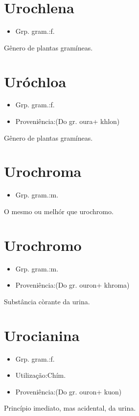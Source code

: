 \documentclass{article}
\begin{document}
\section{Urochlena}
\begin{itemize}
\item {Grp. gram.:f.}
\end{itemize}
Gênero de plantas gramíneas.
\section{Uróchloa}
\begin{itemize}
\item {Grp. gram.:f.}
\end{itemize}
\begin{itemize}
\item {Proveniência:(Do gr. \textunderscore oura\textunderscore  + \textunderscore khlon\textunderscore )}
\end{itemize}
Gênero de plantas gramíneas.
\section{Urochroma}
\begin{itemize}
\item {Grp. gram.:m.}
\end{itemize}
O mesmo ou melhór que \textunderscore urochromo\textunderscore .
\section{Urochromo}
\begin{itemize}
\item {Grp. gram.:m.}
\end{itemize}
\begin{itemize}
\item {Proveniência:(Do gr. \textunderscore ouron\textunderscore  + \textunderscore khroma\textunderscore )}
\end{itemize}
Substância còrante da urina.
\section{Urocianina}
\begin{itemize}
\item {Grp. gram.:f.}
\end{itemize}
\begin{itemize}
\item {Utilização:Chím.}
\end{itemize}
\begin{itemize}
\item {Proveniência:(Do gr. \textunderscore ouron\textunderscore  + \textunderscore kuon\textunderscore )}
\end{itemize}
Princípio imediato, mas acidental, da urina.
\end{document}
